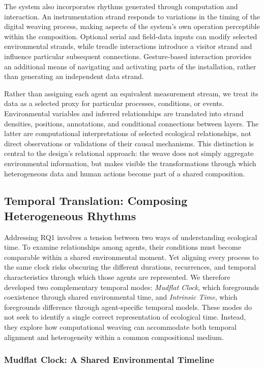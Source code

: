 \documentclass[manuscript,review,anonymous]{acmart}
\begin{document}
The system also incorporates rhythms generated through computation and interaction. An instrumentation strand responds to variations in the timing of the digital weaving process, making aspects of the system's own operation perceptible within the composition. Optional serial and field-data inputs can modify selected environmental strands, while treadle interactions introduce a visitor strand and influence particular subsequent connections. Gesture-based interaction provides an additional means of navigating and activating parts of the installation, rather than generating an independent data strand.

Rather than assigning each agent an equivalent measurement stream, we treat its data as a selected proxy for particular processes, conditions, or events. Environmental variables and inferred relationships are translated into strand densities, positions, annotations, and conditional connections between layers. The latter are computational interpretations of selected ecological relationships, not direct observations or validations of their causal mechanisms. This distinction is central to the design's relational approach: the weave does not simply aggregate environmental information, but makes visible the transformations through which heterogeneous data and human actions become part of a shared composition.

\subsection{Temporal Translation: Composing Heterogeneous Rhythms}

Addressing RQ1 involves a tension between two ways of understanding ecological time. To examine relationships among agents, their conditions must become comparable within a shared environmental moment. Yet aligning every process to the same clock risks obscuring the different durations, recurrences, and temporal characteristics through which those agents are represented. We therefore developed two complementary temporal modes: \emph{Mudflat Clock}, which foregrounds coexistence through shared environmental time, and \emph{Intrinsic Time}, which foregrounds difference through agent-specific temporal models. These modes do not seek to identify a single correct representation of ecological time. Instead, they explore how computational weaving can accommodate both temporal alignment and heterogeneity within a common compositional medium.

\subsubsection{Mudflat Clock: A Shared Environmental Timeline}
\end{document}
